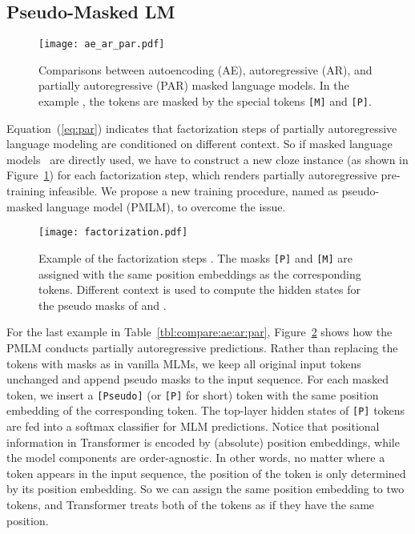 \documentclass{article}
\newcommand{\eqform}[1]{Equation~(\ref{#1})}
\newcommand\pmlmfull{pseudo-masked language model}
\newcommand\pmlm{\textsc{PMLM}}
\newcommand{\sptk}[1]{\texttt{[#1]}}
\begin{document}
\subsection{Pseudo-Masked LM}
\label{sec:pseudo}


\begin{figure}[t]
\centering
\texttt{[image: ae\_ar\_par.pdf]}
\caption{
Comparisons between autoencoding (AE), autoregressive (AR), and partially autoregressive (PAR) masked language models.
In the example , the tokens  are masked by the special tokens \sptk{M} and \sptk{P}.
}
\label{fig:ae_ar_par}
\end{figure}


\eqform{eq:par} indicates that factorization steps of partially autoregressive language modeling are conditioned on different context.
So if masked language models~\cite{bert} are directly used, we have to construct a new cloze instance (as shown in Figure~\ref{fig:ae_ar_par}) for each factorization step, which renders partially autoregressive pre-training infeasible.
We propose a new training procedure, named as \pmlmfull{} (\pmlm{}), to overcome the issue.


\begin{figure}[t]
\centering
\texttt{[image: factorization.pdf]}
\caption{
Example of the factorization steps .
The masks \sptk{P} and \sptk{M} are assigned with the same position embeddings as the corresponding tokens.
Different context is used to compute the hidden states for the pseudo masks of  and .
}
\label{fig:pmlm}
\end{figure}


For the last example in Table~\ref{tbl:compare:ae:ar:par}, Figure~\ref{fig:pmlm} shows how the \pmlm{} conducts partially autoregressive predictions.
Rather than replacing the tokens with masks as in vanilla MLMs, we keep all original input tokens unchanged and append pseudo masks to the input sequence.
For each masked token, we insert a \sptk{Pseudo} (or \sptk{P} for short) token with the same position embedding of the corresponding token. The top-layer hidden states of \sptk{P} tokens are fed into a softmax classifier for MLM predictions.
Notice that positional information in Transformer is encoded by (absolute) position embeddings, while the model components are order-agnostic. In other words, no matter where a token appears in the input sequence, the position of the token is only determined by its position embedding. So we can assign the same position embedding to two tokens, and Transformer treats both of the tokens as if they have the same position.
\end{document}

